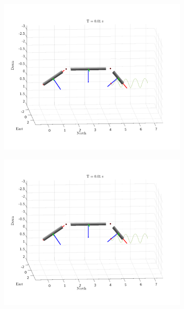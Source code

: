 \begin{figure}[h!]
\begin{subfigure}[b]{0.45\linewidth}
        \includegraphics[page=3,width=\linewidth]{assets/results/kinematic/gif.pdf}
    \end{subfigure}
    \begin{subfigure}[b]{0.45\linewidth}
        \includegraphics[page=4,width=\linewidth]{assets/results/kinematic/gif.pdf}
    \end{subfigure}
    \begin{subfigure}[b]{0.45\linewidth}

\end{subfigure}
\end{figure}
